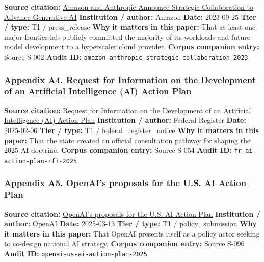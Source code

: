 \documentclass[
  american,
  11pt,
  letterpaper,
]{article}
\begin{document}
\textbf{Source citation:}
\href{https://press.aboutamazon.com/2023/9/amazon-and-anthropic-announce-strategic-collaboration-to-advance-generative-ai}{Amazon
and Anthropic Announce Strategic Collaboration to Advance Generative AI}
\textbf{Institution / author:} Amazon \textbf{Date:} 2023-09-25
\textbf{Tier / type:} T1 / press\_release \textbf{Why it matters in this
paper:} That at least one major frontier lab publicly committed the
majority of its workloads and future model development to a hyperscaler
cloud provider. \textbf{Corpus companion entry:} Source S-002
\textbf{Audit ID:}
\texttt{amazon-anthropic-strategic-collaboration-2023}

\subsubsection{Appendix A4. Request for Information on the Development
of an Artificial Intelligence (AI) Action
Plan}\label{appendix-a4-request-for-information-on-the-development-of-an-artificial-intelligence-ai-action-plan}

\textbf{Source citation:}
\href{https://www.federalregister.gov/documents/2025/02/06/2025-02305/request-for-information-on-the-development-of-an-artificial-intelligence-ai-action-plan}{Request
for Information on the Development of an Artificial Intelligence (AI)
Action Plan} \textbf{Institution / author:} Federal Register
\textbf{Date:} 2025-02-06 \textbf{Tier / type:} T1 /
federal\_register\_notice \textbf{Why it matters in this paper:} That
the state created an official consultation pathway for shaping the 2025
AI doctrine. \textbf{Corpus companion entry:} Source S-054 \textbf{Audit
ID:} \texttt{fr-ai-action-plan-rfi-2025}

\subsubsection{Appendix A5. OpenAI's proposals for the U.S. AI Action
Plan}\label{appendix-a5-openais-proposals-for-the-us-ai-action-plan}

\textbf{Source citation:}
\href{https://openai.com/global-affairs/openai-proposals-for-the-us-ai-action-plan/}{OpenAI's
proposals for the U.S. AI Action Plan} \textbf{Institution / author:}
OpenAI \textbf{Date:} 2025-03-13 \textbf{Tier / type:} T1 /
policy\_submission \textbf{Why it matters in this paper:} That OpenAI
presents itself as a policy actor seeking to co-design national AI
strategy. \textbf{Corpus companion entry:} Source S-096 \textbf{Audit
ID:} \texttt{openai-us-ai-action-plan-2025}
\end{document}

